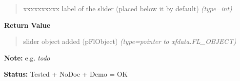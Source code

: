 \begin{boxedminipage}{\funcwidth}
\begin{quote}
\begin{Ventry}{xxxxxxxxxx}
label of the slider (placed below it by default)
            {\it (type=int)}

        \end{Ventry}

      \end{quote}

      \textbf{Return Value}
    \vspace{-1ex}

      \begin{quote}

slider object added (pFlObject)
      {\it (type=pointer to xfdata.FL\_OBJECT)}

      \end{quote}

\textbf{Note:} 
e.g. \emph{todo}


\textbf{Status:} 
Tested + NoDoc + Demo = OK


    \end{boxedminipage}

    \label{xformslib:flslider:fl_add_valslider}

    \vspace{0.5ex}


